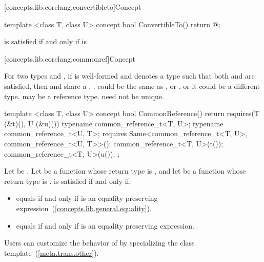 [concepts.lib.corelang.convertibleto]{Concept }

%
\begin{itemdecl}
template <class T, class U>
concept bool ConvertibleTo() {
  return @\seebelow@;
}
\end{itemdecl}

\begin{itemdescr}
\pnum
{} is satisfied
if and only if  is .
\end{itemdescr}

[concepts.lib.corelang.commonref]{Concept }

\pnum
For two types  and , if 
is well-formed and denotes a type  such that both
 and  are
satisfied, then  and  share a , . \enternote {} could be the same as , or
, or it could be a different type.  may be a reference
type.  need not be unique.\exitnote

%
\begin{itemdecl}
template <class T, class U>
concept bool CommonReference() {
  return requires(T (&t)(), U (&u)()) {
    typename common_reference_t<T, U>;
    typename common_reference_t<U, T>;
    requires Same<common_reference_t<T, U>,
                  common_reference_t<U, T>>();
    common_reference_t<T, U>(t());
    common_reference_t<T, U>(u());
  };
}
\end{itemdecl}

\begin{itemdescr}
\pnum
Let  be . Let  be a
function whose return type is , and let  be a function
whose return type is .  is satisfied
if and only if:
\begin{itemize}
\item {} equals  if and only if  is an
  equality preserving expression~(\ref{concepts.lib.general.equality}).
\item {} equals  if and only if  is an
  equality preserving expression.
\end{itemize}

\pnum
\enternote Users can customize the behavior of  by specializing the
 class template~(\ref{meta.trans.other}).\exitnote
\end{itemdescr}


